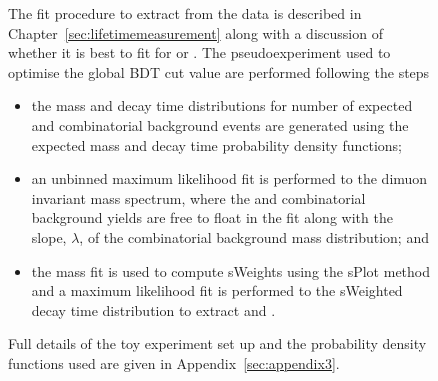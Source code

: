 \begin{figure}[tbp]
The fit procedure to extract \tmumu from the data is described in Chapter~\ref{sec:lifetimemeasurement} along with a discussion of whether it is best to fit for \tmumu or \invtmumu. The pseudoexperiment used to optimise the global BDT cut value are performed following the steps
\begin{itemize}
\item the mass and decay time distributions for number of expected \bsmumu and combinatorial background events are generated using the expected mass and decay time probability density functions;
\item an unbinned maximum likelihood fit is performed to the dimuon invariant mass spectrum, where the \bsmumu and combinatorial background yields are free to float in the fit along with the slope, $\lambda$, of the combinatorial background mass distribution; and 
\item the mass fit is used to compute sWeights using the sPlot method \cite{Pivk:2004ty} and a maximum likelihood fit is performed to the sWeighted decay time distribution to extract \tmumu and \invtmumu. 
\end{itemize}
Full details of the toy experiment set up and the probability density functions used are given in Appendix~\ref{sec:appendix3}. 


\end{figure}
